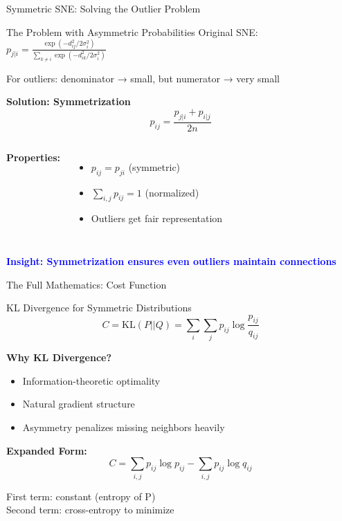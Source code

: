 \documentclass[aspectratio=169]{beamer}
\newcommand{\conceptbox}[2]{\colorbox{#1!20}{\textcolor{#1}{\textbf{#2}}}}
\newcommand{\insight}[1]{\conceptbox{blue}{Insight: #1}}
\begin{document}
\begin{frame}{Symmetric SNE: Solving the Outlier Problem}
\begin{block}{The Problem with Asymmetric Probabilities}
Original SNE: $p_{j|i} = \frac{\exp(-d_{ij}^2/2\sigma_i^2)}{\sum_{k \neq i}\exp(-d_{ik}^2/2\sigma_i^2)}$

For outliers: denominator → small, but numerator → very small
\end{block}

\textbf{Solution: Symmetrization}
$$p_{ij} = \frac{p_{j|i} + p_{i|j}}{2n}$$

\begin{columns}
\textbf{Properties:}
\begin{itemize}
\item $p_{ij} = p_{ji}$ (symmetric)
\item $\sum_{i,j} p_{ij} = 1$ (normalized)
\item Outliers get fair representation
\end{itemize}

\begin{center}
\end{center}
\end{columns}

\insight{Symmetrization ensures even outliers maintain connections}
\end{frame}

\begin{frame}{The Full Mathematics: Cost Function}
\begin{block}{KL Divergence for Symmetric Distributions}
$$C = \text{KL}(P||Q) = \sum_{i} \sum_{j} p_{ij} \log \frac{p_{ij}}{q_{ij}}$$
\end{block}

\textbf{Why KL Divergence?}
\begin{itemize}
\item Information-theoretic optimality
\item Natural gradient structure
\item Asymmetry penalizes missing neighbors heavily
\end{itemize}

\textbf{Expanded Form:}
$$C = \sum_{i,j} p_{ij} \log p_{ij} - \sum_{i,j} p_{ij} \log q_{ij}$$

First term: constant (entropy of P)\\
Second term: cross-entropy to minimize
\end{frame}
\end{document}

